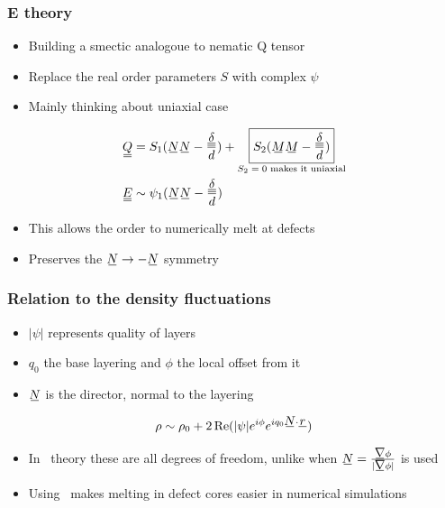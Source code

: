 \documentclass[10pt]{beamer}
\begin{document}
\begin{frame}
\frametitle{E theory}
\begin{itemize}
    \item Building a smectic analogoue to nematic Q tensor
    \item Replace the real order parameters $S$ with complex $\psi$
    \item Mainly thinking about uniaxial case
\end{itemize}
\begin{align*}
    \du{Q} &= S_1(\su{N}\su{N} - \frac{\du{\delta}}{d}) + \underset{\text{$S_2=0$ makes it uniaxial}}{\boxed{S_2(\su{M}\su{M} - \frac{\du{\delta}}{d})}} \\
    \du{E} &\sim \psi_1(\su{N}\su{N} - \frac{\du{\delta}}{d})
\end{align*}
\begin{itemize}
    \item This allows the order to numerically melt at defects
    \item Preserves the $\su{N}\rightarrow-\su{N}$ symmetry
\end{itemize}
\end{frame}

\begin{frame}
\frametitle{Relation to the density fluctuations}
\begin{itemize}
    \item $|\psi|$ represents quality of layers
    \item $q_0$ the base layering and $\phi$ the local offset from it
    \item $\su{N}$ is the director, normal to the layering
\end{itemize}
\begin{align*}
    \rho \sim \rho_0 + 2\Re(|\psi|e^{i\phi} e^{i q_0 \su{N} \cdot \su{r}})
\end{align*}
\begin{itemize}
    \item In \EE\ theory these are all degrees of freedom, unlike when $\su{N} = \frac{\su{\nabla}\phi}{|\su{\nabla}\phi|}$ is used
    \item Using \EE\ makes melting in defect cores easier in numerical simulations
\end{itemize}
\end{frame}
\end{document}
